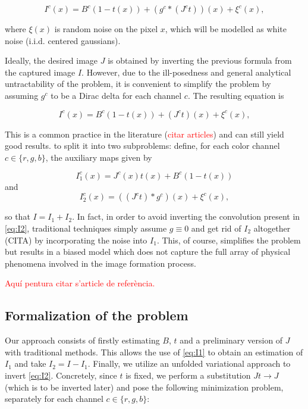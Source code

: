 \documentclass[twocolumn,twoside,a4paper,10pt]{IEEEtran}
\newcommand{\Frank}[1]{\textcolor{red}{#1}}
\begin{document}
\begin{equation}\label{eq:physical-model}
  I^c(x) = B^c\left(1 - t(x)\right) + \left(g^c\ast\left(J^c t\right)\right) (x) + \xi^c(x),
\end{equation}

where \(\xi(x)\) is random noise on the pixel \(x\), which will be modelled as white noise (i.i.d. centered gaussians).

Ideally, the desired image \(J\) is obtained by inverting the previous formula from the captured image \(I\). However, due to the ill-posedness and general analytical untractability of the problem, it is convenient to simplify the problem by assuming \(g^c\) to be a Dirac delta for each channel \(c\). The resulting equation is

\begin{equation}\label{eq:simplified-physical-model}
  I^c(x) = B^c\left(1 - t(x)\right) + \left(J^c t\right) (x) + \xi^c(x),
\end{equation}

This is a common practice in the literature (\Frank{citar articles}) and can still yield good results.
to split it into two subproblems: define, for each color channel \(c\in\{r, g, b\}\), the auxiliary maps given by

\begin{equation}\label{eq:I1}
  I_1^c(x)=J^c(x)t(x) + B^c(1-t(x))
\end{equation}
and 
\begin{equation}\label{eq:I2}
  I_2^c(x) = \left(\left(J^ct\right)\ast g^c\right)(x) + \xi^c(x),
\end{equation}

so that \(I = I_1 + I_2\). In fact, in order to avoid inverting the convolution present in \cref{eq:I2}, traditional techniques simply assume \(g\equiv 0\) and get rid of \(I_2\) altogether (CITA) by incorporating the noise into \(I_1\). This, of course, simplifies the problem but results in a biased model which does not capture the full array of physical phenomena involved in the image formation process.

\Frank{Aquí pentura citar s'article de referència.}

\subsection{Formalization of the problem}
Our approach consists of firstly estimating \(B\), \(t\) and a preliminary version of \(J\) with traditional methods. This allows the use of \cref{eq:I1} to obtain an estimation of \(I_1\) and take \(I_2 = I - I_1\). Finally, we utilize an unfolded variational approach to invert \cref{eq:I2}. Concretely, since \(t\) is fixed, we perform a substitution \(Jt\to J\) (which is to be inverted later) and pose the following minimization problem, separately for each channel \(c\in\{r, g, b\}\):
\end{document}
